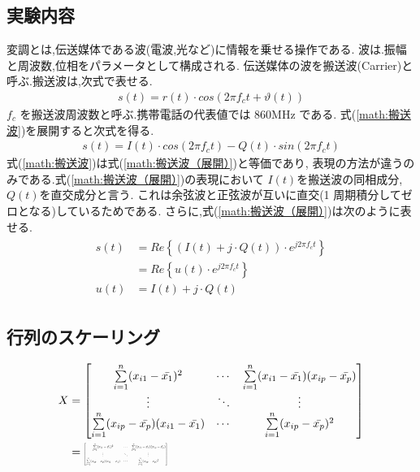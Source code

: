 \documentclass{jsarticle}	       %
\newcommand\scalemath[2]{\scalebox{#1}{\mbox{\ensuremath{\displaystyle #2}}}}
\begin{document}
		\subsection{実験内容}
			変調とは,伝送媒体である波(電波,光など)に情報を乗せる操作である.
			波は.振幅と周波数,位相をパラメータとして構成される.
			伝送媒体の波を搬送波(Carrier)と呼ぶ.搬送波は,次式で表せる.
			\begin{align}
				\label{math:搬送波}
				s(t) = r(t) \cdot cos(2 \pi f_c t + \vartheta (t) )
			\end{align}
			$f_c$ を搬送波周波数と呼ぶ.携帯電話の代表値では 860MHz である.
			式(\ref{math:搬送波})を展開すると次式を得る.
			\begin{align}
				\label{math:搬送波（展開）}
				s(t) = I(t) \cdot cos(2 \pi f_c t) - Q(t) \cdot sin(2 \pi f_c t)
			\end{align}
			式(\ref{math:搬送波})は式(\ref{math:搬送波（展開）})と等価であり,
			表現の方法が違うのみである.式(\ref{math:搬送波（展開）})の表現において
			$I(t)$を搬送波の同相成分,$Q(t)$を直交成分と言う.
			これは余弦波と正弦波が互いに直交(1 周期積分してゼロとなる)しているためである.
			さらに,式(\ref{math:搬送波（展開）})は次のように表せる.
			\begin{align}
				\label{搬送波（展開）別表現}
				\begin{split}
					s(t) 
						&= Re \left\{ \left( I(t) + j \cdot Q(t) \right)
							\cdot e^{j2 \pi f_c t} \right\} \\
						&= Re \left\{ u(t) \cdot e^{j2 \pi f_c t} \right\} \\
					u(t)&= I(t) + j \cdot Q(t)
				\end{split}
			\end{align}

		\subsection{行列のスケーリング}
			\begin{align*}
				X
				&= \begin{bmatrix}
						\sum\limits_{i=1}^n (x_{i1}-\bar{x_1})^2 & \cdots 
							& \sum\limits_{i=1}^n (x_{i1}-\bar{x_1})(x_{ip}-\bar{x_p}) \\
						\vdots & \ddots & \vdots \\
						\sum\limits_{i=1}^n (x_{ip}-\bar{x_p})(x_{i1}-\bar{x_1}) 
							& \cdots & \sum\limits_{i=1}^n (x_{ip}-\bar{x_p})^2
					\end{bmatrix} \\
				&= \scalemath{0.3}{
						\begin{bmatrix}
							\sum\limits_{i=1}^n (x_{i1}-\bar{x_1})^2 & \cdots 
								& \sum\limits_{i=1}^n (x_{i1}-\bar{x_1})(x_{ip}-\bar{x_p}) \\
							\vdots & \ddots & \vdots \\
							\sum\limits_{i=1}^n (x_{ip}-\bar{x_p})(x_{i1}-\bar{x_1}) 
								& \cdots & \sum\limits_{i=1}^n (x_{ip}-\bar{x_p})^2
						\end{bmatrix}
					}
			\end{align*}
\end{document}
